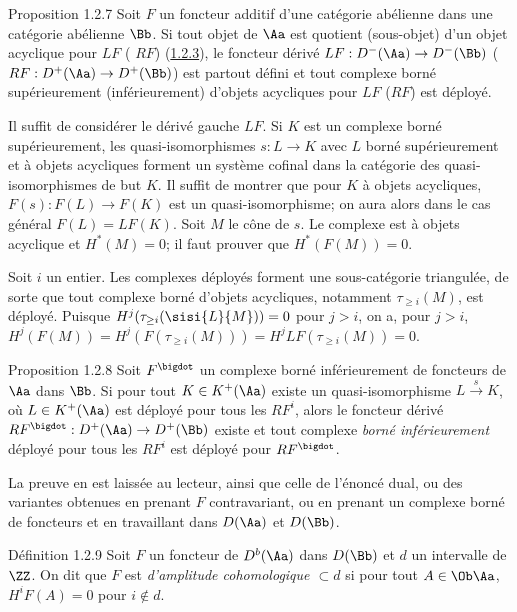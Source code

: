 \documentclass[10pt]{../fichiers-configuration-latex/smfart}
\begin{document}
\begin{enonce*}{Proposition 1.2.7}
Soit $F$ un foncteur additif d'une catégorie abélienne dans une
catégorie abélienne $\Bb$. Si tout objet de $\Aa$ est
quotient (\resp sous-objet) d'un objet acyclique pour $LF$ (\resp
$RF$) (\hyperref[XVII.def1.2.3]{1.2.3}), le foncteur dérivé $LF:D^{-}(\Aa)\rightarrow
D^{-}(\Bb)$ (\resp $RF:D^{+}(\Aa)\rightarrow
D^{+}(\Bb)$) est partout défini et tout complexe borné
supérieurement (\resp inférieurement) d'objets acycliques pour $LF$
(\resp $RF$) est déployé.
\end{enonce*}

Il suffit de considérer le dérivé gauche $LF$. Si $K$ est un complexe
borné supérieurement, les quasi-isomorphismes $s:L\rightarrow K$ avec
$L$ borné supérieurement et à objets acycliques forment un système
cofinal dans la catégorie des quasi-isomorphismes de but $K$. Il
suffit de montrer que pour $K$ à objets acycliques,
$F(s):F(L)\rightarrow F(K)$ est un quasi-isomorphisme;\pageoriginale
on aura alors dans le cas général $F(L)=LF(K)$. Soit $M$ le cône de
$s$. Le complexe est à objets acyclique et $H^{\ast}(M)=0$; il faut
prouver que $H^{\ast}(F(M))=0$.

Soit $i$ un entier. Les complexes déployés forment une sous-catégorie
triangulée, de sorte que tout complexe borné d'objets acycliques,
notamment $\tau_{\geq i}(M)$, est déployé. Puisque $H^{j}(\tau_{\geq
i}(\sisi{L}{M}))=0$ pour $j>i$, on a, pour $j>i$,
$H^{j}(F(M))=H^{j}(F(\tau_{\geq i}(M)))=H^{j}LF(\tau_{\geq i}(M))=0$.

\begin{enonce*}{Proposition 1.2.8}
Soit $F^{\bigdot}$ un complexe borné inférieurement de foncteurs de
$\Aa$ dans $\Bb$. Si pour tout $K\in
K^{+}(\Aa)$ existe un quasi-isomorphisme $L\xrightarrow{s}K$,
où $L\in K^{+}(\Aa)$ est déployé pour tous les $RF^{i}$, alors
le foncteur dérivé $RF^{\bigdot}:D^{+}(\Aa)\rightarrow
D^{+}(\Bb)$ existe et tout complexe \emph{borné
inférieurement} déployé pour tous les $RF^{i}$ est déployé pour $RF^{\bigdot}$.
\end{enonce*}

\sisi{\noindent}{}%
La preuve en est laissée au lecteur, ainsi que celle de l'énoncé dual,
ou des variantes obtenues en prenant $F$ contravariant, ou en prenant
un complexe borné de foncteurs et en travaillant dans $D(\Aa)$
et $D(\Bb)$.

\begin{enonce*}{Définition 1.2.9}
Soit $F$ un foncteur de $D^{b}(\Aa)$ dans $D(\Bb)$ et
$d$ un intervalle de $\ZZ$. On dit que $F$ est
\emph{d'amplitude cohomologique $\subset d$} si pour tout $A\in \Ob
\Aa$, $H^{i}F(A)=0$ pour $i\not\in d$.
\end{enonce*}
\end{document}
